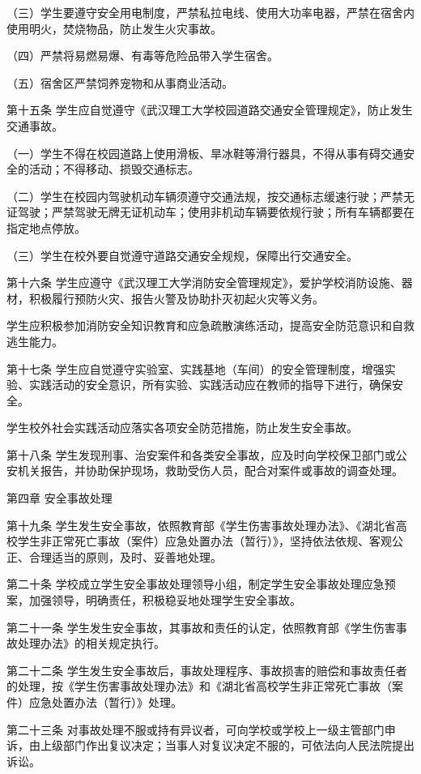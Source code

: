 \documentclass[UTF8,12pt,a4paper]{report}
\begin{document}
（三）学生要遵守安全用电制度，严禁私拉电线、使用大功率电器，严禁在宿舍内使用明火，焚烧物品，防止发生火灾事故。

（四）严禁将易燃易爆、有毒等危险品带入学生宿舍。

（五）宿舍区严禁饲养宠物和从事商业活动。

第十五条 学生应自觉遵守《武汉理工大学校园道路交通安全管理规定》，防止发生交通事故。

（一）学生不得在校园道路上使用滑板、旱冰鞋等滑行器具，不得从事有碍交通安全的活动；不得移动、损毁交通标志。

（二）学生在校园内驾驶机动车辆须遵守交通法规，按交通标志缓速行驶；严禁无证驾驶；严禁驾驶无牌无证机动车；使用非机动车辆要依规行驶；所有车辆都要在指定地点停放。

（三）学生在校外要自觉遵守道路交通安全规规，保障出行交通安全。

第十六条 学生应遵守《武汉理工大学消防安全管理规定》，爱护学校消防设施、器材，积极履行预防火灾、报告火警及协助扑灭初起火灾等义务。

学生应积极参加消防安全知识教育和应急疏散演练活动，提高安全防范意识和自救逃生能力。

第十七条 学生应自觉遵守实验室、实践基地（车间）的安全管理制度，增强实验、实践活动的安全意识，所有实验、实践活动应在教师的指导下进行，确保安全。

学生校外社会实践活动应落实各项安全防范措施，防止发生安全事故。

第十八条 学生发现刑事、治安案件和各类安全事故，应及时向学校保卫部门或公安机关报告，并协助保护现场，救助受伤人员，配合对案件或事故的调查处理。

第四章 安全事故处理

第十九条 学生发生安全事故，依照教育部《学生伤害事故处理办法》、《湖北省高校学生非正常死亡事故（案件）应急处置办法（暂行）》，坚持依法依规、客观公正、合理适当的原则，及时、妥善地处理。

第二十条 学校成立学生安全事故处理领导小组，制定学生安全事故处理应急预案，加强领导，明确责任，积极稳妥地处理学生安全事故。

第二十一条 学生发生安全事故，其事故和责任的认定，依照教育部《学生伤害事故处理办法》的相关规定执行。

第二十二条 学生发生安全事故后，事故处理程序、事故损害的赔偿和事故责任者的处理，按《学生伤害事故处理办法》和《湖北省高校学生非正常死亡事故（案件）应急处置办法（暂行）》处理。

第二十三条 对事故处理不服或持有异议者，可向学校或学校上一级主管部门申诉，由上级部门作出复议决定；当事人对复议决定不服的，可依法向人民法院提出诉讼。
\end{document}

